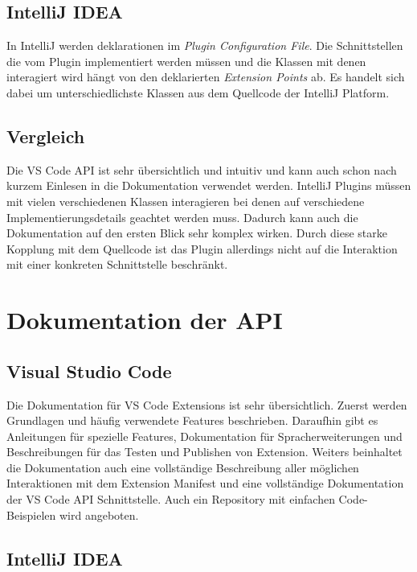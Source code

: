 \subsection{IntelliJ IDEA}

In IntelliJ werden deklarationen im \emph{Plugin Configuration File}.
Die Schnittstellen die vom Plugin implementiert werden müssen und
die Klassen mit denen interagiert wird hängt von den deklarierten
\emph{Extension Points} ab. Es handelt sich dabei um unterschiedlichste
Klassen aus dem Quellcode der IntelliJ Platform.

\subsection{Vergleich}

Die VS Code API ist sehr übersichtlich und intuitiv und kann auch
schon nach kurzem Einlesen in die Dokumentation verwendet werden.
IntelliJ Plugins müssen mit vielen verschiedenen Klassen interagieren
bei denen auf verschiedene Implementierungsdetails geachtet werden muss.
Dadurch kann auch die Dokumentation auf den ersten Blick sehr komplex
wirken. Durch diese starke Kopplung mit dem Quellcode ist das Plugin
allerdings nicht auf die Interaktion mit einer konkreten Schnittstelle beschränkt.


\section{Dokumentation der API}
\label{sec:Vergleich_Dokumentation}

\subsection{Visual Studio Code}

Die Dokumentation für VS Code Extensions ist sehr übersichtlich.
Zuerst werden Grundlagen und häufig verwendete Features beschrieben.
Daraufhin gibt es Anleitungen für spezielle Features,
Dokumentation für Spracherweiterungen und Beschreibungen
für das Testen und Publishen von Extension.
Weiters beinhaltet die Dokumentation auch eine vollständige Beschreibung
aller möglichen Interaktionen mit dem Extension Manifest
und eine vollständige Dokumentation der VS Code API Schnittstelle.
Auch ein Repository mit einfachen Code-Beispielen wird angeboten.

\subsection{IntelliJ IDEA}

